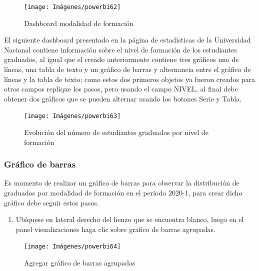 \documentclass[
]{book}
\providecommand{\tightlist}{%
  \setlength{\itemsep}{0pt}\setlength{\parskip}{0pt}}
\begin{document}
\begin{figure}

{\centering \texttt{[image: Imágenes/powerbi62]} 

}

\caption{Dashboard modalidad de formación}\label{fig:dashboardmodalidadformacion-fig}
\end{figure}

El siguiente dashboard presentado en la página de estadísticas de la Universidad Nacional contiene información sobre el nivel de formación de los estudiantes graduados, al igual que el creado anteriormente contiene tres gráficos uno de líneas, una tabla de texto y un gráfico de barras y alternancia entre el gráfico de líneas y la tabla de texto; como estos dos primeros objetos ya fueron creados para otros campos replique los pasos, pero usando el campo NIVEL, al final debe obtener dos gráficos que se pueden alternar usando los botones Serie y Tabla.

\begin{figure}

{\centering \texttt{[image: Imágenes/powerbi63]} 

}

\caption{Evolución del número de estudiantes graduados por nivel de formación}\label{fig:evolucionnivelformacion-fig}
\end{figure}

\hypertarget{gruxe1fico-de-barras}{%
\subsubsection{Gráfico de barras}\label{gruxe1fico-de-barras}}

Es momento de realizar un gráfico de barras para observar la distribución de graduados por modalidad de formación en el periodo 2020-1, para crear dicho gráfico debe seguir estos pasos.

\begin{enumerate}
\def\labelenumi{\arabic{enumi}.}
\tightlist
\item
  Ubíquese en lateral derecho del lienzo que se encuentra blanco, luego en el panel visualizaciones haga clic sobre grafico de barras agrupadas.
\end{enumerate}

\begin{figure}

{\centering \texttt{[image: Imágenes/powerbi64]} 

}

\caption{Agregar gráfico de barras agrupadas}\label{fig:paso1barras-fig}
\end{figure}
\end{document}
